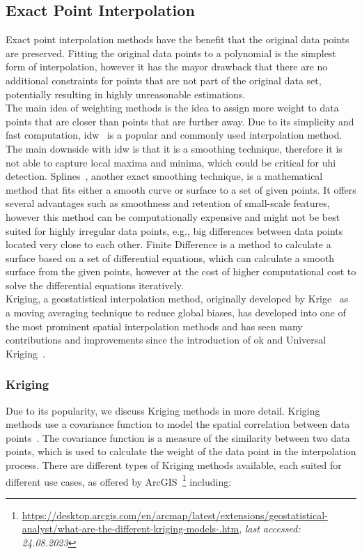 \subsection{Exact Point Interpolation}

Exact point interpolation methods have the benefit that the original data points are preserved. Fitting the original data points to a polynomial is the simplest form of interpolation, however it has the mayor drawback that there are no additional constraints for points that are not part of the original data set, potentially resulting in highly unreasonable estimations.\\
The main idea of weighting methods is the idea to assign more weight to data points that are closer than points that are further away. Due to its simplicity and fast computation, \gls{idw}~\cite{willmott1985small} is a popular and commonly used interpolation method. The main downside with \gls{idw} is that it is a smoothing technique, therefore it is not able to capture local maxima and minima, which could be critical for \gls{uhi} detection. Splines~\cite{mitavs1988general}, another exact smoothing technique, is a mathematical method that fits either a smooth curve or surface to a set of given points. It offers several advantages such as smoothness and retention of small-scale features, however this method can be computationally expensive and might not be best suited for highly irregular data points, e.g., big differences between data points located very close to each other. Finite Difference is a method to calculate a surface based on a set of differential equations, which can calculate a smooth surface from the given points, however at the cost of higher computational cost to solve the differential equations iteratively.\\
Kriging, a geostatistical interpolation method, originally developed by Krige~\cite{krige1976review} as a moving averaging technique to reduce global biases, has developed into one of the most prominent spatial interpolation methods and has seen many contributions and improvements since the introduction of \gls{ok} and Universal Kriging~\cite{li2014spatial}.

\subsubsection{Kriging}

Due to its popularity, we discuss Kriging methods in more detail. Kriging methods use a covariance function to model the spatial correlation between data points~\cite{wackernagel2003multivariate}. The covariance function is a measure of the similarity between two data points, which is used to calculate the weight of the data point in the interpolation process. There are different types of Kriging methods available, each suited for different use cases, as offered by ArcGIS~\footnote{\url{https://desktop.arcgis.com/en/arcmap/latest/extensions/geostatistical-analyst/what-are-the-different-kriging-models-.htm}, \textit{last accessed: 24.08.2023}} including:

